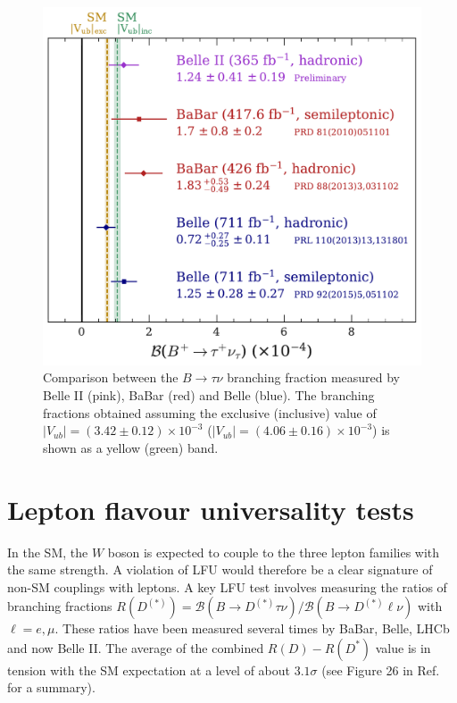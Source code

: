 \documentclass{moriond}
\def\vub{V_{ub}}
\begin{document}
\begin{figure}[h!]
    \centering
    \includegraphics[scale=0.4]{Final_Unblinding_.pdf}
    \caption{Comparison between the $B \to \tau\nu$ branching fraction measured by Belle II (pink), BaBar (red) and Belle (blue). The branching fractions obtained assuming the exclusive (inclusive) value of $|\vub| = (3.42 \pm 0.12)\times 10^{-3}$ ($|\vub| = (4.06 \pm 0.16)\times 10^{-3}$) is shown as a yellow (green) band.}
    \label{fig:Final_Unblinding_}
\end{figure}

\section{Lepton flavour universality tests}
In the SM, the $W$ boson is expected to couple to the three lepton families with the same strength. A violation of LFU would therefore be a clear signature of non-SM couplings with leptons. A key LFU test involves measuring the ratios of branching fractions $R(D^{(*)}) = \mathcal{B}(B \to D^{(*)}\tau\nu)/\mathcal{B}(B \to D^{(*)}\ell\nu)$ with $\ell=e,\mu$. These ratios have been measured several times by BaBar, Belle, LHCb and now Belle II. The average of the combined $R(D)-R(D^*)$ value is in tension with the SM expectation at a level of about $3.1\sigma$ (see Figure 26 in Ref.~\cite{hflav} for a summary).
\end{document}
